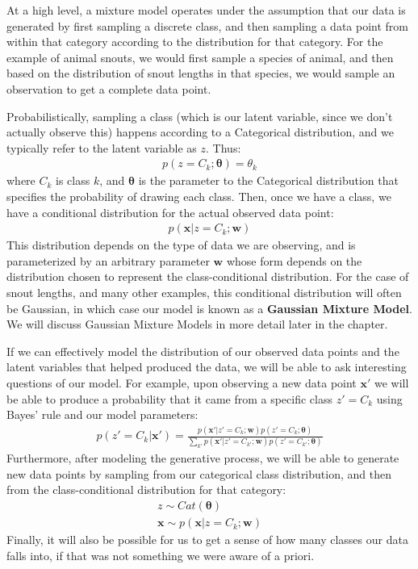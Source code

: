 At a high level, a mixture model operates under the assumption that our data is generated by first sampling a discrete class, and then sampling a data point from within that category according to the distribution for that category. For the example of animal snouts, we would first sample a species of animal, and then based on the distribution of snout lengths in that species, we would sample an observation to get a complete data point.

Probabilistically, sampling a class (which is our latent variable, since we don't actually observe this) happens according to a Categorical distribution, and we typically refer to the latent variable as $z$. Thus:
\begin{align*}
    p(z = C_{k} ; \boldsymbol{\theta}) = \theta_{k}
\end{align*}
where $C_{k}$ is class $k$, and $\boldsymbol{\theta}$ is the parameter to the Categorical distribution that specifies the probability of drawing each class. Then, once we have a class, we have a conditional distribution for the actual observed data point:
\begin{align*}
    p(\textbf{x} | z = C_{k}; \textbf{w})
\end{align*}
This distribution depends on the type of data we are observing, and is parameterized by an arbitrary parameter $\textbf{w}$ whose form depends on the distribution chosen to represent the class-conditional distribution. For the case of snout lengths, and many other examples, this conditional distribution will often be Gaussian, in which case our model is known as a \textbf{Gaussian Mixture Model}. We will discuss Gaussian Mixture Models in more detail later in the chapter.

If we can effectively model the distribution of our observed data points and the latent variables that helped produced the data, we will be able to ask interesting questions of our model. For example, upon observing a new data point $\textbf{x}'$ we will be able to produce a probability that it came from a specific class $z' = C_k$ using Bayes' rule and our model parameters:
\begin{align*}
    p(z' = C_k | \textbf{x}') = \frac{p(\textbf{x}' | z' = C_{k}; \textbf{w})p(z' = C_{k} ; \boldsymbol{\theta})}{\sum_{k'} p(\textbf{x}' | z' = C_{k'}; \textbf{w})p(z' = C_{k'} ; \boldsymbol{\theta})}
\end{align*}
Furthermore, after modeling the generative process, we will be able to generate new data points by sampling from our categorical class distribution, and then from the class-conditional distribution for that category:
\begin{align*}
    z \sim Cat(\boldsymbol{\theta}) \\
    \textbf{x} \sim p(\textbf{x} | z = C_{k}; \textbf{w})
\end{align*}
Finally, it will also be possible for us to get a sense of how many classes our data falls into, if that was not something we were aware of a priori.

